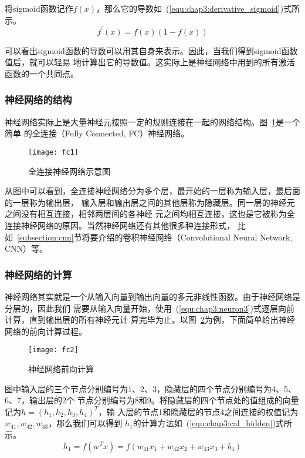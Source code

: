 将sigmoid函数记作$f(x)$，那么它的导数如~(\ref{equ:chap3:derivative_sigmoid})式所示。
\begin{equation}
  \label{equ:chap3:derivative_sigmoid}
  f^\prime(x) = f(x)(1-f(x))
\end{equation}

可以看出sigmoid函数的导数可以用其自身来表示。因此，当我们得到sigmoid函数值后，就可以轻易
地计算出它的导数值。这实际上是神经网络中用到的所有激活函数的一个共同点。

\subsubsection{神经网络的结构}

神经网络实际上是大量神经元按照一定的规则连接在一起的网络结构。图~\ref{fig:fc1}是一个简单
的全连接（Fully Connected, FC）神经网络。
\begin{figure}[ht]
  \centering
  \texttt{[image: fc1]}
  \caption{全连接神经网络示意图}
  \label{fig:fc1}
\end{figure}

从图中可以看到，全连接神经网络分为多个层，最开始的一层称为输入层，最后面的一层称为输出层，
输入层和输出层之间的其他层称为隐藏层。同一层的神经元之间没有相互连接，相邻两层间的各神经
元之间均相互连接，这也是它被称为全连接神经网络的原因。当然神经网络还有其他很多种连接形式，
比如~\ref{subsection:cnn}节将要介绍的卷积神经网络（Convolutional Neural Network, CNN）等。

\subsubsection{神经网络的计算}

神经网络其实就是一个从输入向量到输出向量的多元非线性函数。由于神经网络是分层的，因此我们
需要从输入向量开始，使用~(\ref{equ:chap3:neuron3})式逐层向前计算，直到输出层的所有神经元计
算完毕为止。以图~\ref{fig:fc2}为例，下面简单给出神经网络的前向计算过程。
\begin{figure}[ht]
  \centering
  \texttt{[image: fc2]}
  \caption{神经网络前向计算}
  \label{fig:fc2}
\end{figure}

图中输入层的三个节点分别编号为1、2、3，隐藏层的四个节点分别编号为4、5、6、7，输出层的2个
节点分别编号为8和9。将隐藏层的四个节点处的值组成的向量记为$h=(h_1, h_2, h_3, h_4)^T$，输
入层的节点1和隐藏层的节点4之间连接的权值记为$w_{41}, w_{42}, w_{43}$，那么我们可以得到
$h_1$的计算方法如~(\ref{equ:chap3:cal_hidden})式所示。
\begin{equation}
  \label{equ:chap3:cal_hidden}
  h_1 = f(w^Tx)=f(w_{41}x_1+w_{42}x_2+w_{43}x_3+b_4)
\end{equation}


